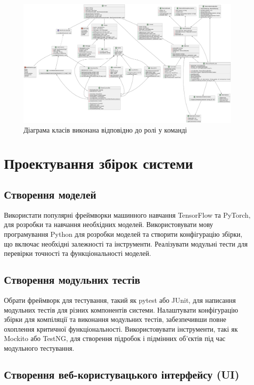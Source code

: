 \documentclass[oneside,14pt]{extarticle}
\begin{document}
\begin{normalsize}
	\begin{figure}[H]
		\centering
		\includegraphics[width=\textwidth]{classes}
		\caption{Діаграма класів виконана відповідно до ролі у команді}
	\end{figure}
		
	\section*{Проектування збірок системи}
	\subsection*{Створення моделей}
		
    Використати популярні фреймворки машинного навчання TensorFlow та PyTorch, для розробки та навчання необхідних моделей.
Використовувати мову програмування Python для розробки моделей та створити конфігурацію збірки, що включає необхідні залежності та інструменти.
Реалізувати модульні тести для перевірки точності та функціональності моделей.
	
\subsection*{Створення модульних тестів}
	
    Обрати фреймворк для тестування, такий як pytest або JUnit, для написання модульних тестів для різних компонентів системи.
Налаштувати конфігурацію збірки для компіляції та виконання модульних тестів, забезпечивши повне охоплення критичної функціональності.
Використовувати інструменти, такі як Mockito або TestNG, для створення підробок і підмінних об'єктів під час модульного тестування.
	
\subsection*{Створення веб-користувацького інтерфейсу (UI)}
	

\end{normalsize}
\end{document}
